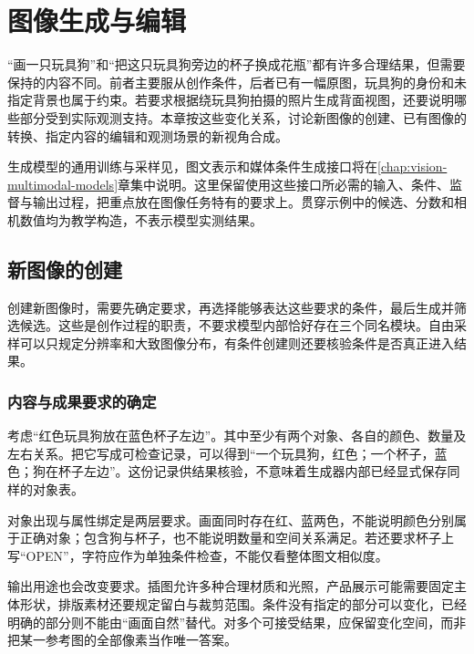 \chapter{图像生成与编辑}
\label{chap:vision-image-generation}

“画一只玩具狗”和“把这只玩具狗旁边的杯子换成花瓶”都有许多合理结果，但需要保持的内容不同。前者主要服从创作条件，后者已有一幅原图，玩具狗的身份和未指定背景也属于约束。若要求根据绕玩具狗拍摄的照片生成背面视图，还要说明哪些部分受到实际观测支持。本章按这些变化关系，讨论新图像的创建、已有图像的转换、指定内容的编辑和观测场景的新视角合成。

生成模型的通用训练与采样见，图文表示和媒体条件生成接口将在\ref{chap:vision-multimodal-models}章集中说明。这里保留使用这些接口所必需的输入、条件、监督与输出过程，把重点放在图像任务特有的要求上。贯穿示例中的候选、分数和相机数值均为教学构造，不表示模型实测结果。

\section{新图像的创建}
\label{sec:vision-generation-creation}

创建新图像时，需要先确定要求，再选择能够表达这些要求的条件，最后生成并筛选候选。这些是创作过程的职责，不要求模型内部恰好存在三个同名模块。自由采样可以只规定分辨率和大致图像分布，有条件创建则还要核验条件是否真正进入结果。

\subsection{内容与成果要求的确定}
\label{sec:vision-generation-requirements}

考虑“红色玩具狗放在蓝色杯子左边”。其中至少有两个对象、各自的颜色、数量及左右关系。把它写成可检查记录，可以得到“一个玩具狗，红色；一个杯子，蓝色；狗在杯子左边”。这份记录供结果核验，不意味着生成器内部已经显式保存同样的对象表。

对象出现与属性绑定是两层要求。画面同时存在红、蓝两色，不能说明颜色分别属于正确对象；包含狗与杯子，也不能说明数量和空间关系满足。若还要求杯子上写“OPEN”，字符应作为单独条件检查，不能仅看整体图文相似度。

输出用途也会改变要求。插图允许多种合理材质和光照，产品展示可能需要固定主体形状，排版素材还要规定留白与裁剪范围。条件没有指定的部分可以变化，已经明确的部分则不能由“画面自然”替代。对多个可接受结果，应保留变化空间，而非把某一参考图的全部像素当作唯一答案。

